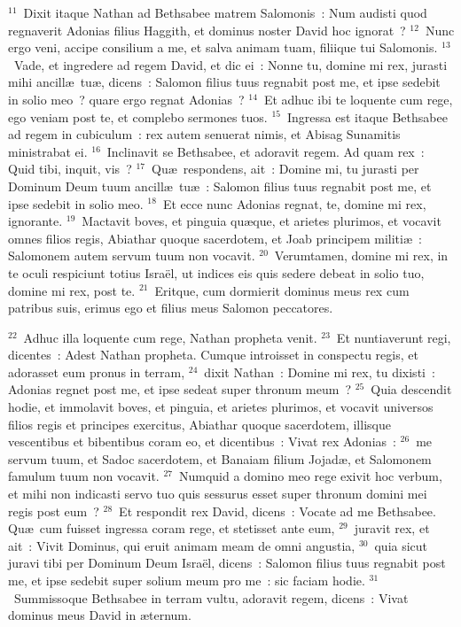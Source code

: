${}^{11}$~Dixit itaque Nathan ad Bethsabee matrem Salomonis~: Num audisti quod regnaverit Adonias filius Haggith, et dominus noster David hoc ignorat~?
${}^{12}$~Nunc ergo veni, accipe consilium a me, et salva animam tuam, filiique tui Salomonis.
${}^{13}$~Vade, et ingredere ad regem David, et dic ei~: Nonne tu, domine mi rex, jurasti mihi ancill\ae\ tu\ae , dicens~: Salomon filius tuus regnabit post me, et ipse sedebit in solio meo~? quare ergo regnat Adonias~?
${}^{14}$~Et adhuc ibi te loquente cum rege, ego veniam post te, et complebo sermones tuos.
${}^{15}$~Ingressa est itaque Bethsabee ad regem in cubiculum~: rex autem senuerat nimis, et Abisag Sunamitis ministrabat ei.
${}^{16}$~Inclinavit se Bethsabee, et adoravit regem. Ad quam rex~: Quid tibi, inquit, vis~?
${}^{17}$~Qu\ae\ respondens, ait~: Domine mi, tu jurasti per Dominum Deum tuum ancill\ae\ tu\ae~: Salomon filius tuus regnabit post me, et ipse sedebit in solio meo.
${}^{18}$~Et ecce nunc Adonias regnat, te, domine mi rex, ignorante.
${}^{19}$~Mactavit boves, et pinguia qu\ae que, et arietes plurimos, et vocavit omnes filios regis, Abiathar quoque sacerdotem, et Joab principem militi\ae~: Salomonem autem servum tuum non vocavit.
${}^{20}$~Verumtamen, domine mi rex, in te oculi respiciunt totius Isra\"el, ut indices eis quis sedere debeat in solio tuo, domine mi rex, post te.
${}^{21}$~Eritque, cum dormierit dominus meus rex cum patribus suis, erimus ego et filius meus Salomon peccatores.


${}^{22}$~Adhuc illa loquente cum rege, Nathan propheta venit.
${}^{23}$~Et nuntiaverunt regi, dicentes~: Adest Nathan propheta. Cumque introisset in conspectu regis, et adorasset eum pronus in terram,
${}^{24}$~dixit Nathan~: Domine mi rex, tu dixisti~: Adonias regnet post me, et ipse sedeat super thronum meum~?
${}^{25}$~Quia descendit hodie, et immolavit boves, et pinguia, et arietes plurimos, et vocavit universos filios regis et principes exercitus, Abiathar quoque sacerdotem, illisque vescentibus et bibentibus coram eo, et dicentibus~: Vivat rex Adonias~:
${}^{26}$~me servum tuum, et Sadoc sacerdotem, et Banaiam filium Jojad\ae , et Salomonem famulum tuum non vocavit.
${}^{27}$~Numquid a domino meo rege exivit hoc verbum, et mihi non indicasti servo tuo quis sessurus esset super thronum domini mei regis post eum~?
${}^{28}$~Et respondit rex David, dicens~: Vocate ad me Bethsabee. Qu\ae\ cum fuisset ingressa coram rege, et stetisset ante eum,
${}^{29}$~juravit rex, et ait~: Vivit Dominus, qui eruit animam meam de omni angustia,
${}^{30}$~quia sicut juravi tibi per Dominum Deum Isra\"el, dicens~: Salomon filius tuus regnabit post me, et ipse sedebit super solium meum pro me~: sic faciam hodie.
${}^{31}$~Summissoque Bethsabee in terram vultu, adoravit regem, dicens~: Vivat dominus meus David in \ae ternum.


